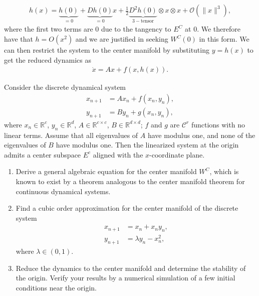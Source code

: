 \begin{enumerate}
\begin{align}
		h(x) = \underbrace{h(0)}_{=0} + \underbrace{Dh(0)}_{=0}x + \frac{1}{2} \underbrace{D^2h(0)}_{3- \textrm{tensor} } \otimes x \otimes x + \mathcal{O}(\|x \| ^3),
	\end{align}
	where the first two terms are 0 due to the tangency to $E^{C}$ at $0$. We therefore have that $h = O(x^2)$ and we are justified in seeking $W^C(0)$ in this form. We can then restrict the system to the center manifold by substituting $y = h(x)$ to get the reduced dynamics as 
	\begin{align}
		\boxed{
			\dot{x}=Ax+f(x,h(x)).
		}
	\end{align}
\end{enumerate}

\begin{exercise}
Consider the discrete dynamical system
\begin{align}
	x_{n+1} &= Ax_n + f(x_n, y_n), \\
	y_{n+1} &= By_n + g(x_n, y_n),
\end{align}
where $x_n \in \mathbb{R}^c$, $y_n \in \mathbb{R}^d$, $A \in \mathbb{R}^{c \times c}$, $B \in \mathbb{R}^{d \times d}$; $f$ and $g$ are $\mathcal{C}^r$ functions with no linear terms. Assume that all eigenvalues of $A$ have modulus one, and none of the eigenvalues of $B$ have modulus one. Then the linearized system at the origin admits a center subspace $E^c$ aligned with the $x$-coordinate plane.

\begin{enumerate}[label=(\alph*)]
	\item Derive a general algebraic equation for the center manifold $W^C$, which is known to exist by a theorem analogous to the center manifold theorem for continuous dynamical systems.
	\item Find a cubic order approximation for the center manifold of the discrete system
	\begin{align}
		x_{n+1} &= x_n + x_ny_n, \\
		y_{n+1} &= \lambda y_n - x_n^2,
	\end{align}
	where $\lambda \in (0,1).$
	\item Reduce the dynamics to the center manifold and determine the stability of the origin. Verify your results by a numerical simulation of a few initial conditions near the origin.
\end{enumerate}
\end{exercise}


